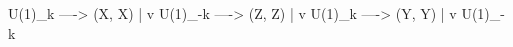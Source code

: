 U(1)_k ----> (X, X)
           |
           v
U(1)_-k ----> (Z, Z)
           |
           v
U(1)_k ----> (Y, Y)
           |
           v
U(1)_-k